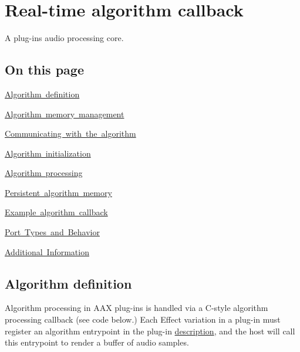 \hypertarget{a00797}{}\section{Real-\/time algorithm callback}
\label{a00797}
A plug-\/in\textquotesingle{}s audio processing core. 

\hypertarget{a00797_algpagecontents}{}\subsection{On this page}\label{a00797_algpagecontents}
\begin{DoxyItemize}
\item \mbox{\hyperlink{a00797_alg_def}{Algorithm definition}} \item \mbox{\hyperlink{a00797_alg_memmgmt}{Algorithm memory management}} \item \mbox{\hyperlink{a00797_alg_comm}{Communicating with the algorithm}} \item \mbox{\hyperlink{a00797_alg_initialization}{Algorithm initialization}} \item \mbox{\hyperlink{a00797_alg_processing}{Algorithm processing}} \item \mbox{\hyperlink{a00797_alg_pd}{Persistent algorithm memory}} \item \mbox{\hyperlink{a00797_alg_examp}{Example algorithm callback}} \item \mbox{\hyperlink{a00797_alg_porttypes}{Port Types and Behavior}} \item \mbox{\hyperlink{a00797_alg_seealso}{Additional Information}}\end{DoxyItemize}
 \hypertarget{a00797_alg_def}{}\subsection{Algorithm definition}\label{a00797_alg_def}
 Algorithm processing in A\+AX plug-\/ins is handled via a C-\/style algorithm processing callback (see code below.) Each Effect variation in a plug-\/in must register an algorithm entrypoint in the plug-\/in \mbox{\hyperlink{a00796}{description}}, and the host will call this entrypoint to render a buffer of audio samples.


\begin{DoxyCode}{0}
\DoxyCodeLine{    \{}
\DoxyCodeLine{        \textcolor{comment}{//}}
\DoxyCodeLine{        \textcolor{comment}{// Processing code...}}
\DoxyCodeLine{        \textcolor{comment}{//}}
\DoxyCodeLine{    \}}
\end{DoxyCode}
 

